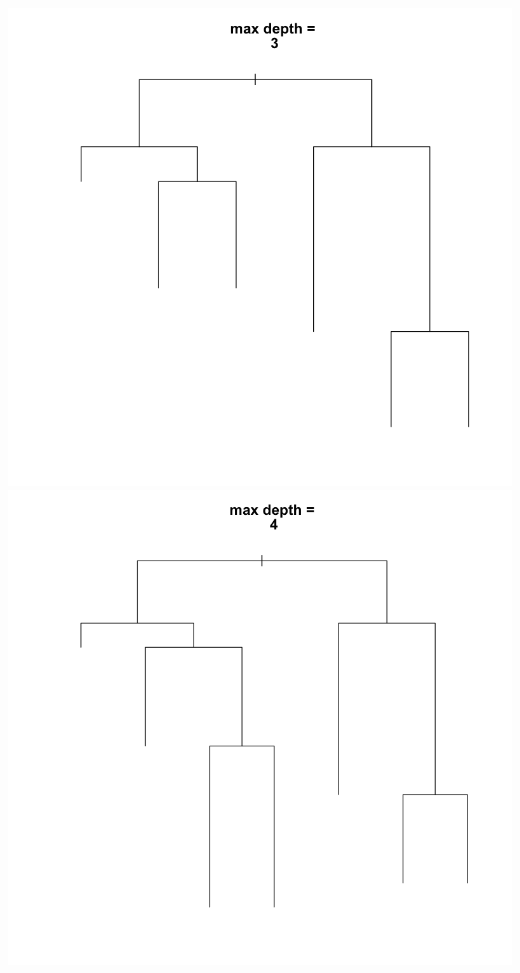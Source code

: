 \documentclass[11pt]{article}
\begin{document}
\begin{center}
\includegraphics[scale=0.25]{images/mdepth=3}
\includegraphics[scale=0.25]{images/mdepth=4}

\end{center}
\end{document}
